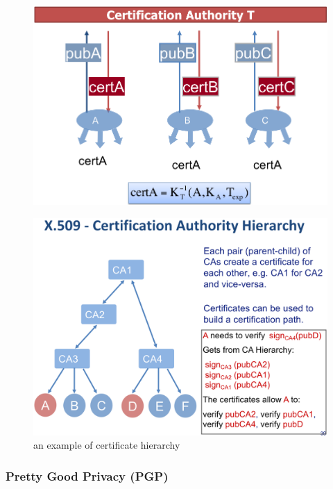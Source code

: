 \documentclass[twocolumn,landscape,10pt]{article}
\theoremstyle{definition}
\begin{document}
\begin{figure}[h]
  	\includegraphics[scale=0.20]{cert.png}
  	\centering
\end{figure}
\begin{figure}[h]
  	\includegraphics[scale=0.30]{cert-hierarchy.png}
  	\centering
    \caption{an example of certificate hierarchy}
\end{figure}

\subsubsection{Pretty Good Privacy (PGP)}
\end{document}
